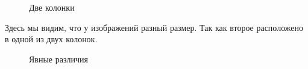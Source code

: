\documentclass[
  english,
  russian,
  12pt,
  a4paper,
  DIV=11,
  numbers=noendperiod]{scrreprt}
\begin{document}
\begin{figure}


\caption{\label{fig-023}Две колонки}

\end{figure}%

Здесь мы видим, что у изображений разный размер. Так как второе
расположено в одной из двух колонок.

\begin{figure}


\caption{\label{fig-024}Явные различия}

\end{figure}%
\end{document}
